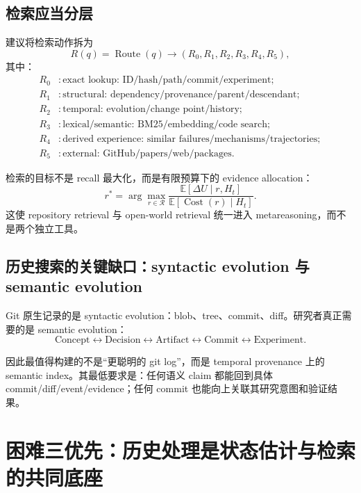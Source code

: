 \documentclass[11pt,a4paper]{ctexart}
\newcommand{\E}{\mathbb{E}}
\newcommand{\Cost}{\operatorname{Cost}}
\begin{document}
\subsection{检索应当分层}

建议将检索动作拆为
\begin{equation}
 R(q)=\operatorname{Route}(q)\to (R_0,R_1,R_2,R_3,R_4,R_5),
\end{equation}
其中：
\begin{align*}
R_0 &: \text{exact lookup: ID/hash/path/commit/experiment};\\
R_1 &: \text{structural: dependency/provenance/parent/descendant};\\
R_2 &: \text{temporal: evolution/change point/history};\\
R_3 &: \text{lexical/semantic: BM25/embedding/code search};\\
R_4 &: \text{derived experience: similar failures/mechanisms/trajectories};\\
R_5 &: \text{external: GitHub/papers/web/packages}.
\end{align*}

检索的目标不是 recall 最大化，而是有限预算下的 evidence allocation：
\begin{equation}
 r^*=\arg\max_{r\in\mathcal R}\frac{\E[\Delta U\mid r,H_t]}{\E[\Cost(r)\mid H_t]}.
\end{equation}
这使 repository retrieval 与 open-world retrieval 统一进入 metareasoning，而不是两个独立工具。

\subsection{历史搜索的关键缺口：syntactic evolution 与 semantic evolution}

Git 原生记录的是 syntactic evolution：blob、tree、commit、diff。研究者真正需要的是 semantic evolution：
\begin{equation}
 \text{Concept}\leftrightarrow\text{Decision}\leftrightarrow\text{Artifact}\leftrightarrow\text{Commit}\leftrightarrow\text{Experiment}.
\end{equation}

因此最值得构建的不是“更聪明的 git log”，而是 temporal provenance 上的 semantic index。其最低要求是：任何语义 claim 都能回到具体 commit/diff/event/evidence；任何 commit 也能向上关联其研究意图和验证结果。

\section{困难三优先：历史处理是状态估计与检索的共同底座}
\end{document}
